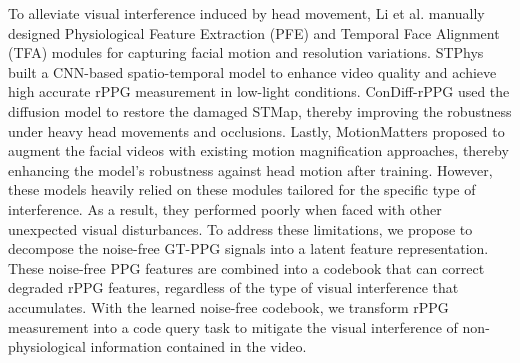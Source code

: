 To alleviate visual interference induced by head movement, Li et al. \cite{LiMotionRobust2023} manually designed Physiological Feature Extraction (PFE) and Temporal Face Alignment (TFA) modules for capturing facial motion and resolution variations. STPhys \cite{CaoSTPhys2024} built a CNN-based spatio-temporal model to enhance video quality and achieve high accurate rPPG measurement in low-light conditions. ConDiff-rPPG \cite{WeiConDiff2024} used the diffusion model to restore the damaged STMap, thereby improving the robustness under heavy head movements and occlusions. Lastly, MotionMatters \cite{MotionMatters2024} proposed to augment the facial videos with existing motion magnification approaches, thereby enhancing the model's robustness against head motion after training. However, these models heavily relied on these modules tailored for the specific type of interference. As a result, they performed poorly when faced with other unexpected visual disturbances. To address these limitations, we propose to decompose the noise-free GT-PPG signals into a latent feature representation. These noise-free PPG features are combined into a codebook that can correct degraded rPPG features, regardless of the type of visual interference that accumulates. With the learned noise-free codebook, we transform rPPG measurement into a code query task to mitigate the visual interference of non-physiological information contained in the video.


